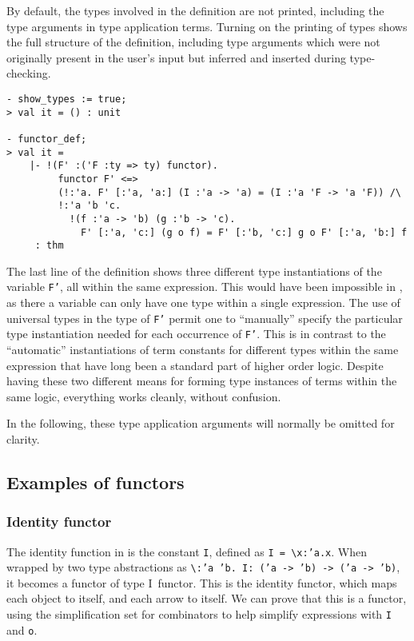 By default, the types involved in the definition are not printed, including
the type arguments in type application terms. Turning on the printing of types
shows the full structure of the definition, including type arguments which were not
originally present in the user's input but inferred and inserted during type-checking.
\begin{session}
\begin{verbatim}
- show_types := true;
> val it = () : unit

- functor_def;
> val it =
    |- !(F' :('F :ty => ty) functor).
         functor F' <=>
         (!:'a. F' [:'a, 'a:] (I :'a -> 'a) = (I :'a 'F -> 'a 'F)) /\
         !:'a 'b 'c.
           !(f :'a -> 'b) (g :'b -> 'c).
             F' [:'a, 'c:] (g o f) = F' [:'b, 'c:] g o F' [:'a, 'b:] f
     : thm
\end{verbatim}
\end{session}

The last line of the definition shows three different type instantiations
of the variable {\tt F'}, all within the same expression. This would have been
impossible in \HOL{}, as there a variable can only have one type within a single
expression. The use of universal types in the type of {\tt F'} permit one
to ``manually'' specify the particular type instantiation needed for each
occurrence of {\tt F'}. This is in contrast to the ``automatic'' instantiations
of term constants for different types within the same expression that have
long been a standard part of higher order logic.  Despite having these two
different means for forming type instances of terms within the same logic,
everything works cleanly, without confusion.

In the following,
these type application arguments will normally be omitted for clarity.


\subsection{Examples of functors}


\subsubsection{Identity functor}

The identity function in \HOL{} is the constant {\tt I}, defined as
{\tt I~=~}\verb|\|{\tt x:'a.x}.
When wrapped by two type abstractions as
\verb|\|{\tt {:}'a~'b.~I: ('a -> 'b) -> ('a -> 'b)},
it becomes a functor of type {\sf I~functor}.
This is the identity functor, which maps each object to itself, and
each arrow to itself. We can prove that this is a functor,
using the simplification set for combinators to
help simplify expressions with {\tt I} and {\tt o}.

